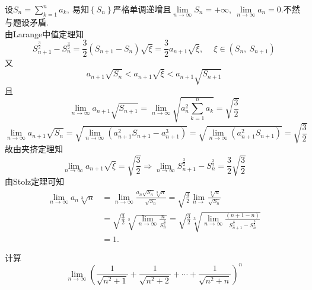 	\begin{solution}
		设$S_n=\sum\limits_{k=1}^{n}a_k,\ $易知$\left\{S_n\right\}$严格单调递增且$\lim\limits_{n\rightarrow\infty}S_n=+\infty,\ \lim\limits_{n\rightarrow\infty}a_n=0.$不然与题设矛盾.\\
		由Larange中值定理知
		$$S_{n+1}^{\frac{3}{2}}-S_{n}^{\frac{3}{2}}=\frac{3}{2}\left(S_{n+1}-S_n\right)\sqrt{\xi}=\frac{3}{2}a_{n+1}\sqrt{\xi},\ \quad\xi\in\left(S_n,\ S_{n+1}\right)$$
		又
		$$a_{n+1}\sqrt{S_n}<a_{n+1}\sqrt{\xi}<a_{n+1}\sqrt{S_{n+1}}$$
		且
		$$\lim\limits_{n\rightarrow\infty}a_{n+1}\sqrt{S_{n+1}}=\lim\limits_{n\rightarrow\infty}\sqrt{a_n^2\sum\limits_{k=1}^{n}a_k}=\sqrt{\frac{3}{2}}$$
		$$\lim\limits_{n\rightarrow\infty}a_{n+1}\sqrt{S_n}=\sqrt{\lim\limits_{n\rightarrow\infty}\left(a_{n+1}^2S_{n+1}-a_{n+1}^3\right)}=\sqrt{\lim\limits_{n\rightarrow\infty}\left(a_{n+1}^2S_{n+1}\right)}=\sqrt{\frac{3}{2}}$$
		故由夹挤定理知
		$$\lim\limits_{n\rightarrow\infty}a_{n+1}\sqrt{\xi}=\sqrt{\frac{3}{2}}\Rightarrow\lim\limits_{n\rightarrow\infty}S_{n+1}^{\frac{3}{2}}-S_{n}^{\frac{3}{2}}=\frac{3}{2}\sqrt{\frac{3}{2}}$$
		由Stolz定理可知
		\begin{align*}
			\lim\limits_{n\rightarrow\infty}a_n\sqrt[3]{n}&=\lim\limits_{n\rightarrow\infty}\frac{a_n\sqrt{S_n}\sqrt[3]{n}}{\sqrt{S_n}}=\sqrt{\frac{3}{2}}\lim\limits_{n\rightarrow}\frac{\sqrt[3]{n}}{\sqrt{S_n}}\\
			&=\sqrt{\frac{3}{2}}\sqrt[3]{\lim\limits_{n\rightarrow\infty}\frac{n}{S_n^\frac{3}{2}}}=\sqrt{\frac{3}{2}}\sqrt[3]{\lim\limits_{n\rightarrow\infty}\frac{(n+1-n)}{S_{n+1}^{\frac{3}{2}}-S_{n}^{\frac{3}{2}}}}\\
			&=1.
		\end{align*}
	\end{solution}
	\newpage
	\begin{problem}
		计算
		$$\lim\limits_{n\rightarrow\infty}\left(\frac{1}{\sqrt{n^2+1}}+\frac{1}{\sqrt{n^2+2}}+\cdots+\frac{1}{\sqrt{n^2+n}}\right)^n$$
	\end{problem}
	

